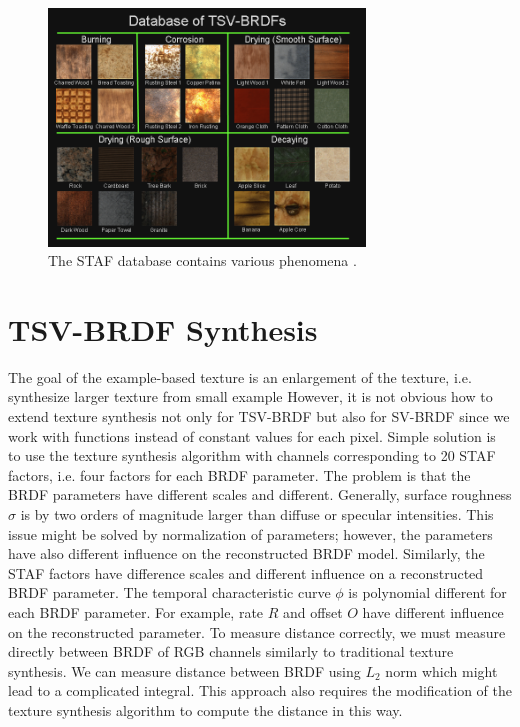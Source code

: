 \documentclass[11pt]{article}
\begin{document}
\begin{figure}[htb] 
\begin{center}
\includegraphics[width=0.75\textwidth]{figures/database}
\end{center}
\caption{The STAF database contains various phenomena \cite{Gu2006}.}
\label{Fig:Database}
\end{figure}

\section{TSV-BRDF Synthesis}
The goal of the example-based texture is an enlargement of the texture, i.e. synthesize larger texture from small example However, it is not obvious how to extend texture synthesis not only for TSV-BRDF but also for SV-BRDF since we work with functions instead of constant values for each pixel. Simple solution is to use the texture synthesis algorithm with channels corresponding to 20 STAF factors, i.e. four factors for each BRDF parameter. The problem is that the BRDF parameters have different scales and different. Generally, surface roughness $\sigma$ is by two orders of magnitude larger than diffuse or specular intensities. This issue might be solved by normalization of parameters; however, the parameters have also different influence on the reconstructed BRDF model. Similarly, the STAF factors have difference scales and different influence on a reconstructed BRDF parameter. The temporal characteristic curve $\phi$ is polynomial different for each BRDF parameter. For example, rate $R$ and offset $O$ have different influence on the reconstructed parameter. To measure distance correctly, we must measure directly between BRDF of RGB channels similarly to traditional texture synthesis. We can measure distance between BRDF using $L_2$ norm which might lead to a complicated integral. This approach also requires the modification of the texture synthesis algorithm to compute the distance in this way. 
\end{document}
